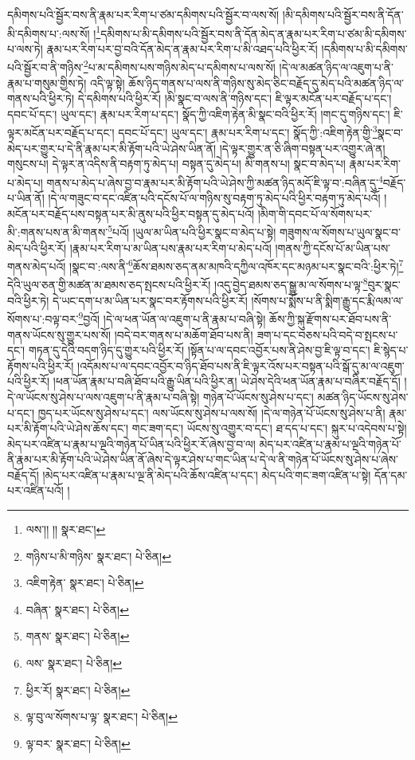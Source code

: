 དམིགས་པའི་སྦྱོར་བས་ནི་རྣམ་པར་རིག་པ་ཙམ་དམིགས་པའི་སྦྱོར་བ་ལས་སོ། །མི་དམིགས་པའི་སྦྱོར་བས་ནི་དོན་མི་དམིགས་པ་:ལས་སོ། །\footnote{ལས་།། །།  སྣར་ཐང་། }དམིགས་པ་མི་དམིགས་པའི་སྦྱོར་བས་ནི་དོན་མེད་ན་རྣམ་པར་རིག་པ་ཙམ་མི་དམིགས་པ་ལས་ཏེ། རྣམ་པར་རིག་པར་བྱ་བའི་དོན་མེད་ན་རྣམ་པར་རིག་པ་མི་འཐད་པའི་ཕྱིར་རོ། །དམིགས་པ་མི་དམིགས་པའི་སྦྱོར་བ་ནི་གཉིས་\footnote{གཉིས་པ་མི་གཉིས་  སྣར་ཐང་།  པེ་ཅིན། }པ་མ་དམིགས་པས་གཉིས་མེད་པ་དམིགས་པ་ལས་སོ། །དེ་ལ་མཚན་ཉིད་ལ་འཇུག་པ་ནི་རྣམ་པ་གསུམ་གྱིས་ཏེ། འདི་ལྟ་སྟེ། ཆོས་ཉིད་གནས་པ་ལས་ནི་གཉིས་སུ་མེད་ཅིང་བརྗོད་དུ་མེད་པའི་མཚན་ཉིད་ལ་གནས་པའི་ཕྱིར་ཏེ། དེ་དམིགས་པའི་ཕྱིར་རོ། །མི་སྣང་བ་ལས་ནི་གཉིས་དང་། ཇི་ལྟར་མངོན་པར་བརྗོད་པ་དང་། དབང་པོ་དང་། ཡུལ་དང་། རྣམ་པར་རིག་པ་དང་། སྣོད་ཀྱི་འཇིག་རྟེན་མི་སྣང་བའི་ཕྱིར་རོ། །གང་དུ་གཉིས་དང་། ཇི་ལྟར་མངོན་པར་བརྗོད་པ་དང་། དབང་པོ་དང་། ཡུལ་དང་། རྣམ་པར་རིག་པ་དང་། སྣོད་ཀྱི་:འཇིག་རྟེན་གྱི་\footnote{འཇིག་རྟེན་  སྣར་ཐང་།  པེ་ཅིན། }སྣང་བ་མེད་པར་གྱུར་པ་དེ་ནི་རྣམ་པར་མི་རྟོག་པའི་ཡེ་ཤེས་ཡིན་ནོ། །དེ་ལྟར་གྱུར་ན་ཅི་ཞིག་བསྟན་པར་འགྱུར་ཞེ་ན། གསུངས་པ། དེ་ལྟར་ན་འདིས་ནི་བརྟག་ཏུ་མེད་པ། བསྟན་དུ་མེད་པ། མི་གནས་པ། སྣང་བ་མེད་པ། རྣམ་པར་རིག་པ་མེད་པ། གནས་པ་མེད་པ་ཞེས་བྱ་བ་རྣམ་པར་མི་རྟོག་པའི་ཡེ་ཤེས་ཀྱི་མཚན་ཉིད་མདོ་ཇི་ལྟ་བ་:བཞིན་དུ་\footnote{བཞིན་  སྣར་ཐང་།  པེ་ཅིན། }བརྗོད་པ་ཡིན་ནོ། །དེ་ལ་གཟུང་བ་དང་འཛིན་པའི་དངོས་པོ་ལ་གཉིས་སུ་བརྟག་ཏུ་མེད་པའི་ཕྱིར་བརྟག་ཏུ་མེད་པའོ། །མངོན་པར་བརྗོད་པས་བསྟན་པར་མི་ནུས་པའི་ཕྱིར་བསྟན་དུ་མེད་པའོ། །མིག་གི་དབང་པོ་ལ་སོགས་པར་མི་:གནས་པས་ན་མི་གནས་\footnote{གནས་  སྣར་ཐང་།  པེ་ཅིན། }པའོ། །ཡུལ་མ་ཡིན་པའི་ཕྱིར་སྣང་བ་མེད་པ་སྟེ། གཟུགས་ལ་སོགས་པ་ཡུལ་སྣང་བ་མེད་པའི་ཕྱིར་རོ། །རྣམ་པར་རིག་པ་མ་ཡིན་པས་རྣམ་པར་རིག་པ་མེད་པའོ། །གནས་ཀྱི་དངོས་པོ་མ་ཡིན་པས་གནས་མེད་པའོ། །སྣང་བ་:ལས་ནི་\footnote{ལས་  སྣར་ཐང་།  པེ་ཅིན། }ཆོས་ཐམས་ཅད་ནམ་མཁའི་དཀྱིལ་འཁོར་དང་མཉམ་པར་སྣང་བའི་:ཕྱིར་ཏེ།\footnote{ཕྱིར་རོ།  སྣར་ཐང་།  པེ་ཅིན། } དེའི་ཡུལ་ཅན་གྱི་མཚན་མ་ཐམས་ཅད་སྤངས་པའི་ཕྱིར་རོ། །འདུ་བྱེད་ཐམས་ཅད་སྒྱུ་མ་ལ་སོགས་པ་ལྟ་\footnote{ལྟ་བུ་ལ་སོགས་པ་ལྟ་  སྣར་ཐང་།  པེ་ཅིན། }བུར་སྣང་བའི་ཕྱིར་ཏེ། དེ་ཡང་དག་པ་མ་ཡིན་པར་སྣང་བར་རྟོགས་པའི་ཕྱིར་རོ། །སོགས་པ་སྨོས་པ་ནི་སྨིག་རྒྱུ་དང་རྨི་ལམ་ལ་སོགས་པ་:བལྟ་བར་\footnote{ལྟ་བར་  སྣར་ཐང་།  པེ་ཅིན། }བྱའོ། །དེ་ལ་ཕན་ཡོན་ལ་འཇུག་པ་ནི་རྣམ་པ་བཞི་སྟེ། ཆོས་ཀྱི་སྐུ་རྫོགས་པར་ཐོབ་པས་ནི་གནས་ཡོངས་སུ་གྱུར་པས་སོ། །བདེ་བར་གནས་པ་མཆོག་ཐོབ་པས་ནི། ཟག་པ་དང་བཅས་པའི་བདེ་བ་སྤངས་པ་དང་། གཏན་དུ་དེའི་བདག་ཉིད་དུ་གྱུར་པའི་ཕྱིར་རོ། །སྟོན་པ་ལ་དབང་འབྱོར་པས་ནི་ཤེས་བྱ་ཇི་ལྟ་བ་དང་། ཇི་སྙེད་པ་རྟོགས་པའི་ཕྱིར་རོ། །འདོམས་པ་ལ་དབང་འབྱོར་བ་ཉིད་ཐོབ་པས་ནི་ཇི་ལྟར་འོས་པར་བསྟན་པའི་སྒོ་དུ་མ་ལ་འཇུག་པའི་ཕྱིར་རོ། །ཕན་ཡོན་རྣམ་པ་བཞི་ཐོབ་པའི་རྒྱུ་ཡིན་པའི་ཕྱིར་ན། ཡེ་ཤེས་དེའི་ཕན་ཡོན་རྣམ་པ་བཞིར་བརྗོད་དོ། །དེ་ལ་ཡོངས་སུ་ཤེས་པ་ལས་འཇུག་པ་ནི་རྣམ་པ་བཞི་སྟེ། གཉེན་པོ་ཡོངས་སུ་ཤེས་པ་དང་། མཚན་ཉིད་ཡོངས་སུ་ཤེས་པ་དང་། ཁྱད་པར་ཡོངས་སུ་ཤེས་པ་དང་། ལས་ཡོངས་སུ་ཤེས་པ་ལས་སོ། །དེ་ལ་གཉེན་པོ་ཡོངས་སུ་ཤེས་པ་ནི། རྣམ་པར་མི་རྟོག་པའི་ཡེ་ཤེས་ཆོས་དང་། གང་ཟག་དང་། ཡོངས་སུ་འགྱུར་བ་དང་། ཐ་དད་པ་དང་། སྐུར་པ་འདེབས་པ་སྟེ། མེད་པར་འཛིན་པ་རྣམ་པ་ལྔའི་གཉེན་པོ་ཡིན་པའི་ཕྱིར་རོ་ཞེས་བྱ་བ་ལ། མེད་པར་འཛིན་པ་རྣམ་པ་ལྔའི་གཉེན་པོ་ནི་རྣམ་པར་མི་རྟོག་པའི་ཡེ་ཤེས་ཡིན་ནོ་ཞེས་དེ་ལྟར་ཤེས་པ་གང་ཡིན་པ་དེ་ལ་ནི་གཉེན་པོ་ཡོངས་སུ་ཤེས་པ་ཞེས་བརྗོད་དོ། །མེད་པར་འཛིན་པ་རྣམ་པ་ལྔ་ནི་མེད་པའི་ཆོས་འཛིན་པ་དང་། མེད་པའི་གང་ཟག་འཛིན་པ་སྟེ། དོན་དམ་པར་འཛིན་པའོ། །
